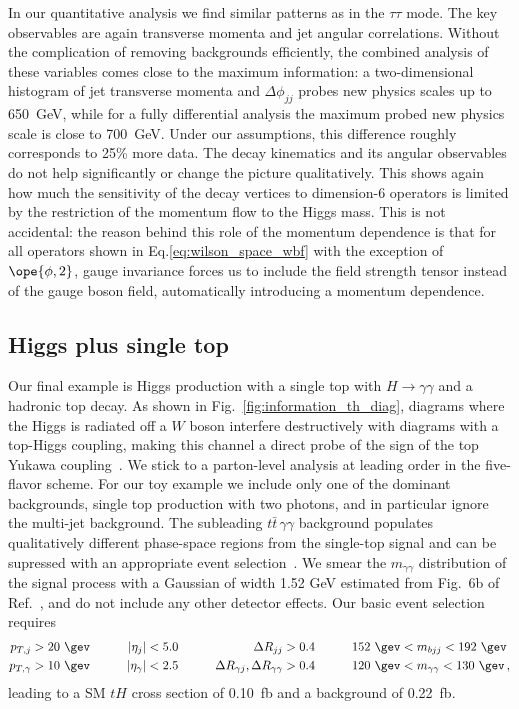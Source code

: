 In our quantitative analysis we find similar patterns as in the
$\tau \tau$ mode. The key observables are again transverse momenta and
jet angular correlations. Without the complication of removing
backgrounds efficiently, the combined analysis of these variables
comes close to the maximum information: a two-dimensional histogram of
jet transverse momenta and $\Delta \phi_{jj}$ probes new physics
scales up to 650~GeV, while for a fully differential analysis the
maximum probed new physics scale is close to 700~GeV. Under our
assumptions, this difference roughly corresponds to 25\% more
data. The decay kinematics and its angular observables do not help
significantly or change the picture qualitatively.  This shows again
how much the sensitivity of the decay vertices to dimension-6
operators is limited by the restriction of the momentum flow to the
Higgs mass. This is not accidental: the reason behind this role of the
momentum dependence is that for all operators shown in
Eq.\;\eqref{eq:wilson_space_wbf} with the exception of $\ope{\phi,2}$,
gauge invariance forces us to include the field strength tensor
instead of the gauge boson field, automatically introducing a momentum
dependence.



\subsection{Higgs plus single top}
\label{sec:information_th}

Our final example is Higgs production with a single top with
$H\to \gamma \gamma$ and a hadronic top decay. As shown in
Fig.~\ref{fig:information_th_diag}, diagrams where the Higgs is radiated off a $W$
boson interfere destructively with diagrams with a top-Higgs coupling,
making this channel a direct probe of the sign of the top Yukawa
coupling~\cite{top_higgs}. We stick to a parton-level analysis at
leading order in the five-flavor scheme. For our toy example we
include only one of the dominant backgrounds, single top production
with two photons, and in particular ignore the multi-jet
background. The subleading $t\bar{t} \, \gamma\gamma$ background
populates qualitatively different phase-space regions from the
single-top signal and can be supressed with an appropriate event
selection~\cite{Kling:2012up}. We smear the $m_{\gamma \gamma}$
distribution of the signal process with a Gaussian of width 1.52 GeV
estimated from Fig.~6b of Ref.~\cite{CMS:2016zjv}, and do not include
any other detector effects. Our basic event selection requires
%
\begin{alignat}{4}
  p_{T,j} &> 20 \ \gev \quad & \quad
  |\eta_{j}| &< 5.0 \quad & \quad
  \Delta R_{jj} &> 0.4 \quad & \quad
  152 \ \gev &<m_{bjj} < 192 \ \gev \notag \\ 
  p_{T,\gamma} &> 10 \ \gev \quad & \quad
  |\eta_{\gamma}| &< 2.5 \quad & \quad 
  \Delta R_{\gamma j} , \Delta R_{\gamma \gamma} &> 0.4 \quad & \quad
  120 \ \gev &<m_{\gamma \gamma} < 130 \ \gev \,,
  \label{eq:th_acceptance_cuts}
\end{alignat}
%
leading to a SM $tH$ cross section of 0.10~fb and a background of 0.22~fb.

